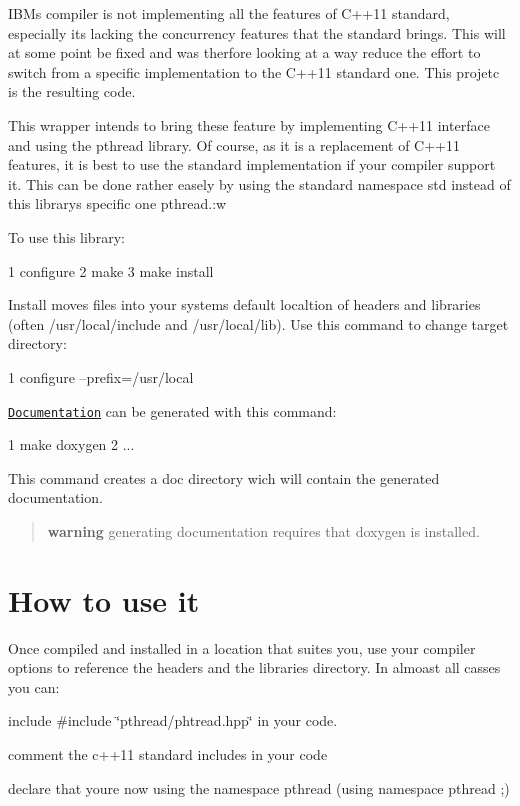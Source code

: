 I\+BM\textquotesingle{}s compiler is not implementing all the features of C++11 standard, especially it\textquotesingle{}s lacking the concurrency features that the standard brings. This will at some point be fixed and was therfore looking at a way reduce the effort to switch from a specific implementation to the C++11 standard one. This projetc is the resulting code.

This wrapper intends to bring these feature by implementing C++11 interface and using the pthread library. Of course, as it is a replacement of C++11 features, it is best to use the standard implementation if your compiler support it. This can be done rather easely by using the standard namespace {\ttfamily std} instead of this library\textquotesingle{}s specific one {\ttfamily pthread}.\+:w

To use this library\+: 
\begin{DoxyCode}
1 configure
2 make
3 make install
\end{DoxyCode}


Install moves files into your system\textquotesingle{}s default localtion of headers and libraries (often /usr/local/include and /usr/local/lib). Use this command to change target directory\+: 
\begin{DoxyCode}
1 configure --prefix=/usr/local
\end{DoxyCode}


\href{http://herbertkoelman.github.io/cpp-pthread/doc/html/}{\tt Documentation} can be generated with this command\+: 
\begin{DoxyCode}
1 make doxygen
2 ...
\end{DoxyCode}


This command creates a {\ttfamily doc} directory wich will contain the generated documentation.

\begin{quote}
{\bfseries warning} generating documentation requires that doxygen is installed. \end{quote}


\section*{How to use it}

Once compiled and installed in a location that suites you, use your compiler options to reference the headers and the libraries directory. In almoast all casses you can\+:
\begin{DoxyItemize}
\item include {\ttfamily \#include \char`\"{}pthread/phtread.\+hpp\char`\"{}} in your code.
\item comment the c++11 standard includes in your code
\item declare that you\textquotesingle{}re now using the namespace pthread ({\ttfamily using namespace pthread ;})
\end{DoxyItemize}

